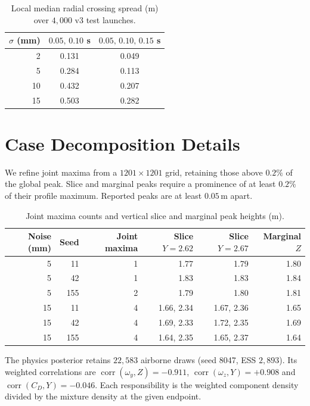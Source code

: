 \documentclass[11pt,a4paper]{article}
\begin{document}
\begin{table}[H]
  \centering
  \small
  \caption{Local median radial crossing spread (m) over $4{,}000$ v3 test launches.}
  \label{tab:local-spread}
  \begin{tabular}{rcc}
    \toprule
    $\sigma$ (mm) & $0.05,\,0.10$ s & $0.05,\,0.10,\,0.15$ s \\
    \midrule
    2  & 0.131 & 0.049 \\
    5  & 0.284 & 0.113 \\
    10 & 0.432 & 0.207 \\
    15 & 0.503 & 0.282 \\
    \bottomrule
  \end{tabular}
\end{table}



\clearpage
\section{Case Decomposition Details}
\label{app:decomp}

We refine joint maxima from a $1201\times1201$ grid, retaining those above $0.2\%$ of the global peak. Slice and marginal peaks require a prominence of at least $0.2\%$ of their profile maximum. Reported peaks are at least $0.05\,\mathrm{m}$ apart.

\begin{table}[H]
  \centering
  \small
  \caption{Joint maxima counts and vertical slice and marginal peak heights (m).}
  \label{tab:peak}
  \begin{tabular}{rrrrrr}
    \toprule
    Noise (mm) & Seed & Joint maxima & Slice $Y=2.62$ & Slice $Y=2.67$ & Marginal $Z$ \\
    \midrule
    5 & 11 & 1 & 1.77 & 1.79 & 1.80 \\
    5 & 42 & 1 & 1.83 & 1.83 & 1.84 \\
    5 & 155 & 2 & 1.79 & 1.80 & 1.81 \\
    15 & 11 & 4 & 1.66, 2.34 & 1.67, 2.36 & 1.65 \\
    15 & 42 & 4 & 1.69, 2.33 & 1.72, 2.35 & 1.69 \\
    15 & 155 & 4 & 1.64, 2.35 & 1.65, 2.37 & 1.64 \\
    \bottomrule
  \end{tabular}
\end{table}

The physics posterior retains $22{,}583$ airborne draws (seed 8047, ESS $2{,}893$). Its weighted correlations are $\operatorname{corr}(\omega_y,Z)=-0.911$, $\operatorname{corr}(\omega_z,Y)=+0.908$ and $\operatorname{corr}(C_D,Y)=-0.046$. Each responsibility is the weighted component density divided by the mixture density at the given endpoint.

% 
\end{document}
